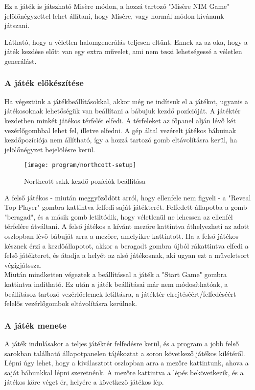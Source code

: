 Ez a játék is játszható Misère módon, a hozzá tartozó "Misère NIM Game" jelölőnégyzettel lehet állítani, hogy Misère, vagy normál módon kívánunk játszani.

Látható, hogy a véletlen halomgenerálás teljesen eltűnt. Ennek az az oka, hogy a játék kezdése előtt van egy extra művelet, ami nem teszi lehetségessé a véletlen generálást.

\subsubsection*{A játék előkészítése}
Ha végeztünk a játékbeállításokkal, akkor még ne indítsuk el a játékot, ugyanis a játékosoknak lehetőségük van beállítani a bábujuk kezdő pozícióját. A játéktér kezdetben minkét játékos térfelét elfedi. A térfeleket az főpanel alján lévő két vezérlőgombbal lehet fel, illetve elfedni. A gép által vezérelt játékos bábuinak kezdőpozíciója nem állítható, így a hozzá tartozó gomb eltávolításra kerül, ha jelölőnégyzet bejelölésre kerül.\\

\begin{figure}[h]
	\texttt{[image: program/northcott-setup]}
	\centering
	\caption{Northcott-sakk kezdő pozíciók beállítása}
	\label{fig:northcott-setup}
\end{figure}

A felső játékos - miután meggyőződött arról, hogy ellenfele nem figyeli - a "Reveal Top Player" gombra kattintva felfedi saját játékterét. Felfedett állapotba a gomb "beragad", és a másik gomb letiltódik, hogy véletlenül ne lehessen az ellenfél térfelére átváltani. A felső játékos a kívánt mezőre kattintva áthelyezheti az adott oszlopban lévő bábuját arra a mezőre, amelyikre kattintott. Ha a felső játékos késznek érzi a kezdőállapotot, akkor a beragadt gombra újból rákattintva elfedi a felső játékteret, és átadja a helyét az alsó játékosnak, aki ugyan ezt a műveletsort végigjátssza. \\

Miután mindketten végeztek a beállítással a játék a "Start Game" gombra kattintva indítható. Ez után a játék beállításai már nem módosíthatóak, a beállításoz tartozó vezérlőelemek letiltásra, a játéktér elrejtéséért/felfedéséért felelős vezérlőgombok eltávolításra kerülnek.


\subsubsection*{A játék menete}
A játék indulásakor a teljes játéktér felfedésre kerül, és a program a jobb felső sarokban található állapotpanelen tájékoztat a soron következő játékos kilétéről. Lépni úgy lehet, hogy a kiválasztott oszlopban arra a mezőre kattintunk, ahova a saját bábunkkal lépni szeretnénk. A mezőre kattintva a lépés bekövetkezik, és a játékos köre véget ér, helyére a következő játékos lép.\\

